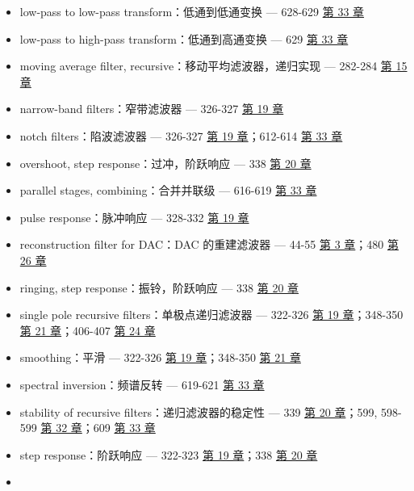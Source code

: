 \begin{itemize}
\begin{itemize}
     \hyperref[ch-21]{第 21 章}
  \item
    low-pass to low-pass transform：低通到低通变换 --- 628-629
     \hyperref[ch-33]{第 33 章}
  \item
    low-pass to high-pass transform：低通到高通变换 --- 629 
    \hyperref[ch-33]{第 33 章}
  \item
    moving average filter, recursive：移动平均滤波器，递归实现 ---
    282-284  \hyperref[ch-15]{第 15 章}
  \item
    narrow-band filters：窄带滤波器 --- 326-327 
    \hyperref[ch-19]{第 19 章}
  \item
    notch filters：陷波滤波器 --- 326-327  \hyperref[ch-19]{第
    19 章}；612-614  \hyperref[ch-33]{第 33 章}
  \item
    overshoot, step response：过冲，阶跃响应 --- 338 
    \hyperref[ch-20]{第 20 章}
  \item
    parallel stages, combining：合并并联级 --- 616-619 
    \hyperref[ch-33]{第 33 章}
  \item
    pulse response：脉冲响应 --- 328-332  \hyperref[ch-19]{第
    19 章}
  \item
    reconstruction filter for DAC：DAC 的重建滤波器 --- 44-55 
    \hyperref[ch-03]{第 3 章}；480  \hyperref[ch-26]{第 26 章}
  \item
    ringing, step response：振铃，阶跃响应 --- 338 
    \hyperref[ch-20]{第 20 章}
  \item
    single pole recursive filters：单极点递归滤波器 --- 322-326
     \hyperref[ch-19]{第 19 章}；348-350 
    \hyperref[ch-21]{第 21 章}；406-407  \hyperref[ch-24]{第
    24 章}
  \item
    smoothing：平滑 --- 322-326  \hyperref[ch-19]{第 19
    章}；348-350  \hyperref[ch-21]{第 21 章}
  \item
    spectral inversion：频谱反转 --- 619-621 
    \hyperref[ch-33]{第 33 章}
  \item
    stability of recursive filters：递归滤波器的稳定性 --- 339
     \hyperref[ch-20]{第 20 章}；599, 598-599 
    \hyperref[ch-32]{第 32 章}；609  \hyperref[ch-33]{第 33
    章}
  \item
    step response：阶跃响应 --- 322-323  \hyperref[ch-19]{第
    19 章}；338  \hyperref[ch-20]{第 20 章}
  \item

\end{itemize}
\end{itemize}
